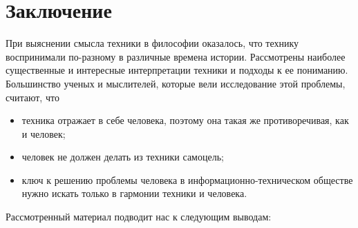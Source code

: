 \section{Заключение}

При выяснении смысла техники в философии оказалось, что технику воспринимали по-разному в различные времена истории. Рассмотрены наиболее существенные и интересные интерпретации техники и подходы к ее пониманию. Большинство ученых и мыслителей, которые вели исследование этой проблемы, считают, что

\begin{itemize}

\item{техника отражает в себе человека, поэтому она такая же противоречивая, как и человек;}
  
\item{человек не должен делать из техники самоцель;}
  
\item{ключ к решению проблемы человека в информационно-техническом обществе нужно искать только в гармонии техники и человека.}

\end{itemize}

Рассмотренный материал подводит нас к следующим выводам:

